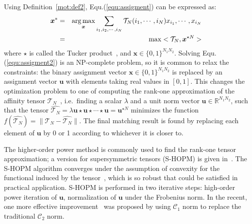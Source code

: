 Using Definition~\ref{mot:def2}, Equ.(\ref{equ:assigment}) can be expressed as:
\begin{eqnarray}
\label{equ:assigment2}
{\boldsymbol{x}}^* &=& \operatorname*{arg\,max}_{\boldsymbol{x}} \sum_{i_1,i_2,\cdots,i_N} \mathcal{T}_N(i_1,\cdots,i_N) x_{i_1},\cdots,x_{i_N} \nonumber\\
&=& \max <\mathcal{T}_N, \boldsymbol{x}^{\star N}>
\end{eqnarray}
where $\star$ is called the Tucker product~\cite{Kofidis02}, and $\boldsymbol{x} \in \{0,1\}^{N_1N_2}$.
Solving Equ.(\ref{equ:assigment2}) is an NP-complete problem,
so it is common to relax the constraints:
the binary assignment vector $\boldsymbol{x}\in \{0,1\}^{N_1N_2}$ is replaced by an assignment vector $\boldsymbol{u}$ with elements taking real values in $[0,1]$.
This changes the optimization problem to one of computing the rank-one approximation of the affinity tensor $\mathcal{T}_N$~\cite{Kofidis02},
i.e.\ finding a scalar $\lambda$ and a unit norm vector $\boldsymbol{u}\in \mathbb{R}^{N_1N_2}$,
such that the tensor $\hat{\mathcal{T}_N} = \lambda \boldsymbol{u}\star \boldsymbol{u} \star\cdots \star \boldsymbol{u}=\boldsymbol{u}^{\star N}$ minimizes the function $f(\hat{\mathcal{T}_N})=\lVert \mathcal{T}_N-\hat{\mathcal{T}_N} \lVert$.
The final matching result is found by replacing each element of $\boldsymbol{u}$ by 0 or 1 according to whichever it is closer to.

The higher-order power method is commonly used to find the rank-one tensor approximation;
a version for supersymmetric tensors (S-HOPM) is given in~\cite{Kofidis02}.
The S-HOPM algorithm converges under the assumption of convexity for the functional induced by the tensor~\cite{Kofidis02},
which is so robust that could be satisfied in practical application.
S-HOPM is performed in two iterative steps: high-order power iteration of $\boldsymbol{u}$, normalization of $\boldsymbol{u}$ under the Frobenius norm.
In the recent, one more effective improvement~\cite{Duchenne_etal09} was proposed by using $\mathcal{C}_1$ norm to replace the traditional $\mathcal{C}_2$ norm.


